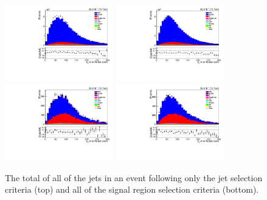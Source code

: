 \begin{figure}[ht]
\centering
\includegraphics[width=0.42\textwidth]{figs/background-estimation/plots/unblinded/prompt_ee_ttbarInc/totalJetPt_NPL_ee_jetSel_ee.pdf}
\includegraphics[width=0.42\textwidth]{figs/background-estimation/plots/unblinded/prompt_mumu_ttbarInc/totalJetPt_NPL_mumu_jetSel_mumu.pdf}
\\
\includegraphics[width=0.42\textwidth]{figs/background-estimation/plots/unblinded/prompt_ee_ttbarInc/totalJetPt_NPL_ee_wMass_ee.pdf}
\includegraphics[width=0.42\textwidth]{figs/background-estimation/plots/unblinded/prompt_mumu_ttbarInc/totalJetPt_NPL_mumu_wMass_mumu.pdf}
\caption{
The total \pT of all of the jets in an event following only the jet selection criteria (top) and all of the signal region selection criteria (bottom).
}
\label{fig:SR_totalJetPt}
\end{figure}

